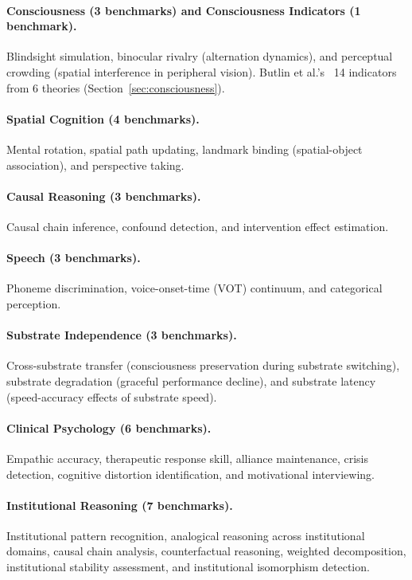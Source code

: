 \documentclass[11pt,letterpaper]{article}
\begin{document}
\paragraph{Consciousness (3 benchmarks) and Consciousness Indicators (1 benchmark).} Blindsight simulation, binocular rivalry (alternation dynamics), and perceptual crowding (spatial interference in peripheral vision). Butlin et al.'s~\citep{butlin2023consciousness} 14 indicators from 6 theories (Section~\ref{sec:consciousness}).

\paragraph{Spatial Cognition (4 benchmarks).} Mental rotation, spatial path updating, landmark binding (spatial-object association), and perspective taking.

\paragraph{Causal Reasoning (3 benchmarks).} Causal chain inference, confound detection, and intervention effect estimation.

\paragraph{Speech (3 benchmarks).} Phoneme discrimination, voice-onset-time (VOT) continuum, and categorical perception.

\paragraph{Substrate Independence (3 benchmarks).} Cross-substrate transfer (consciousness preservation during substrate switching), substrate degradation (graceful performance decline), and substrate latency (speed-accuracy effects of substrate speed).

\paragraph{Clinical Psychology (6 benchmarks).} Empathic accuracy, therapeutic response skill, alliance maintenance, crisis detection, cognitive distortion identification, and motivational interviewing.

\paragraph{Institutional Reasoning (7 benchmarks).} Institutional pattern recognition, analogical reasoning across institutional domains, causal chain analysis, counterfactual reasoning, weighted decomposition, institutional stability assessment, and institutional isomorphism detection.
\end{document}
